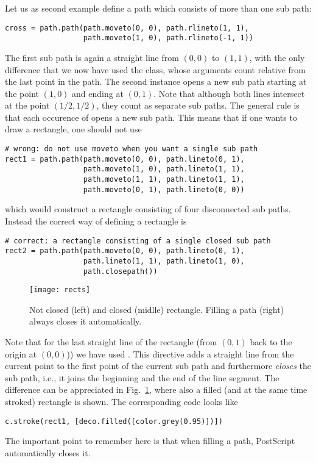Let us as second example define a path which consists of more than 
one sub path:
\begin{verbatim}
cross = path.path(path.moveto(0, 0), path.rlineto(1, 1),
                  path.moveto(1, 0), path.rlineto(-1, 1))
\end{verbatim}
The first sub path is again a straight line from $(0, 0)$ to $(1, 1)$,
with the only difference that we now have used the 
class, whose arguments count relative from the last point in the path.
The second  instance opens a new sub path starting at the
point $(1, 0)$ and ending at $(0, 1)$. Note that although both lines
intersect at the point $(1/2, 1/2)$, they count as separate sub paths.
The general rule is that each occurence of  opens a new
sub path. This means that if one wants to draw a rectangle, one should
not use
\begin{verbatim}
# wrong: do not use moveto when you want a single sub path
rect1 = path.path(path.moveto(0, 0), path.lineto(0, 1),
                  path.moveto(1, 0), path.lineto(1, 1),
                  path.moveto(1, 1), path.lineto(1, 1),
                  path.moveto(0, 1), path.lineto(0, 0))
\end{verbatim}
which would construct a rectangle consisting of four disconnected
sub paths. Instead the correct way of defining a rectangle is 
\begin{verbatim}
# correct: a rectangle consisting of a single closed sub path
rect2 = path.path(path.moveto(0, 0), path.lineto(0, 1), 
                  path.lineto(1, 1), path.lineto(1, 0),
                  path.closepath())
\end{verbatim}
%
\begin{figure}
\centerline{\texttt{[image: rects]}}
\caption{Not closed (left) and closed (midlle) rectangle. Filling a
  path (right) always closes it automatically.}
\label{fig:rects}
\end{figure}
Note that for the last straight line of the rectangle (from $(0, 1)$
back to the origin at $(0, 0)$)) we have used .  This
directive adds a straight line from the current point to the first
point of the current sub path and furthermore \textit{closes} the sub
path, i.e., it joins the beginning and the end of the line segment.
The difference can be appreciated in Fig.~\ref{fig:rects}, where
also a filled (and at the same time stroked) rectangle is shown.
The corresponding code looks like
\begin{verbatim}
c.stroke(rect1, [deco.filled([color.grey(0.95)])])
\end{verbatim}
The important point to remember here is that when filling a path, PostScript
automatically closes it.

